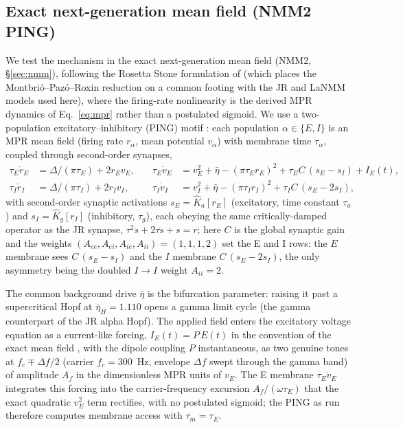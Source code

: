 \documentclass[11pt,a4paper]{article}
\providecommand{\DIFaddend}{} %
\begin{document}
\DIFaddend \subsection{Exact next-generation mean field (NMM2 PING)}
We test the mechanism in the exact next-generation mean field (NMM2, \S\ref{sec:nmm}),
following the Rosetta Stone formulation of \cite{ruffini2025rosetta} (which places the
Montbri\'o--Paz\'o--Roxin reduction \cite{montbrio2015} on a common footing with the JR
and LaNMM models used here), where the firing-rate nonlinearity is the derived MPR
dynamics of Eq.~\eqref{eq:mpr} rather than a postulated sigmoid. We use a two-population
excitatory--inhibitory (PING) motif \cite{ruffini2021nmm2,clusella2023,ruffini2025rosetta}:
each population $\alpha\in\{E,I\}$ is an MPR mean field (firing rate $r_\alpha$, mean
potential $v_\alpha$) with membrane time $\tau_\alpha$, coupled through second-order
synapses,
\begin{equation}
\begin{aligned}
\tau_E\dot r_E&=\Delta/(\pi\tau_E)+2r_Ev_E, &\quad
\tau_E\dot v_E&=v_E^2+\bar\eta-(\pi\tau_E r_E)^2+\tau_E C\,(s_E-s_I)+I_E(t),\\[2pt]
\tau_I\dot r_I&=\Delta/(\pi\tau_I)+2r_Iv_I, &\quad
\tau_I\dot v_I&=v_I^2+\bar\eta-(\pi\tau_I r_I)^2+\tau_I C\,(s_E-2s_I),
\end{aligned}
\label{eq:nmm2-ping}
\end{equation}
with second-order synaptic activations $s_E=\hat K_a[r_E]$ (excitatory, time constant
$\tau_a$) and $s_I=\hat K_g[r_I]$ (inhibitory, $\tau_g$), each obeying the same
critically-damped operator as the JR synapse, $\tau^2\ddot s+2\tau\dot s+s=r$; here $C$
is the global synaptic gain and the weights $(A_{ee},A_{ei},A_{ie},A_{ii})=(1,1,1,2)$
set the E and I rows: the $E$ membrane sees $C\,(s_E-s_I)$ and the $I$ membrane
$C\,(s_E-2s_I)$, the only asymmetry being the doubled $I\!\to\!I$ weight $A_{ii}=2$.

The common background drive $\bar\eta$ is the bifurcation parameter: raising it
past a supercritical Hopf at $\bar\eta_H=1.110$ opens a gamma limit cycle (the gamma
counterpart of the JR alpha Hopf). The applied field enters the excitatory voltage equation
as a current-like forcing, $I_E(t)=P\,E(t)$ in the convention of the exact mean field
\cite{ruffini2021nmm2}, with the dipole coupling $P$ instantaneous, as two genuine tones at
$f_c\mp\Delta f/2$ (carrier $f_c=300$~Hz, envelope $\Delta f$ swept through the gamma band)
of amplitude $A_f$ in the dimensionless MPR units of $v_E$. The E membrane $\tau_E\dot v_E$
integrates this forcing into the carrier-frequency excursion $A_f/(\omega\tau_E)$ that the
exact quadratic $v_E^2$ term rectifies, with no postulated sigmoid; the PING as run
therefore computes membrane access with $\tau_m=\tau_E$.
\end{document}
